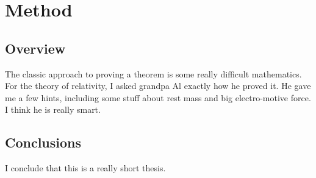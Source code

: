 \chapter{Method}
\section{\label{section:overview}Overview}
   The classic approach to proving a theorem is some really difficult 
   mathematics.  For the theory of relativity, I asked grandpa Al exactly 
   how he proved it.  He gave me a few hints, including some stuff about
   rest mass and big electro-motive force.  I think he is really smart.
\section{Conclusions}
   I conclude that this is a really short thesis.